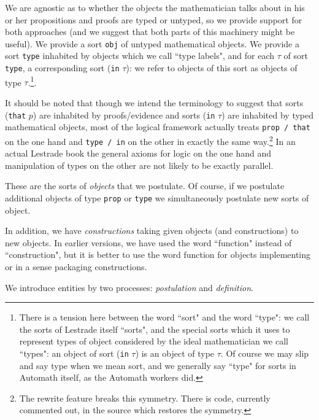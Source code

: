 \documentclass[12pt]{article}
\begin{document}
We are agnostic as to whether the objects the mathematician talks about in his or her propositions and proofs are typed or untyped, so we provide support for both approaches
(and we suggest that both parts of this machinery might be useful).  We provide a sort {\tt obj} of untyped mathematical objects.  We provide a sort {\tt type} inhabited
by objects which we call ``type labels", and for each $\tau$ of sort {\tt type}, a corresponding sort ({\tt in} $\tau$):  we refer to objects of this sort as objects of type $\tau$.\footnote{There is a tension here between the word ``sort" and the word ``type":  we call the sorts of Lestrade itself ``sorts", and the special sorts which it uses to represent types of object considered by the ideal mathematician we call ``types":  an object of sort ({\tt in} $\tau$) is an object of type $\tau$.  Of course we may slip and say type when we mean sort, and we generally say ``type" for sorts in Automath itself, as the Automath workers did.}.

It should be noted that though we intend
the terminology to suggest that sorts ({\tt that} $p$) are inhabited by proofs/evidence and sorts ({\tt in} $\tau$) are inhabited by typed mathematical objects, most of the logical framework actually treats  {\tt prop / that} on the one hand and {\tt type / in} on the other in exactly the same way.\footnote{The rewrite feature breaks this symmetry.  There is code, currently commented out, in the source which restores the symmetry.}   In an actual Lestrade book the general axioms for logic on the one hand and manipulation of types on the other are not likely to be exactly parallel.

These are the sorts of {\em objects} that we postulate.  Of course, if we postulate additional objects of type {\tt prop} or {\tt type} we simultaneously postulate new sorts of object.

In addition, we have {\em constructions\/} taking given objects (and constructions) to new objects.  In earlier versions, we have used the word ``function" instead of ``construction", but it is better to use the word function for  objects implementing or in a sense packaging constructions.

We introduce entities by two processes:  {\em postulation} and {\em definition}.
\end{document}
